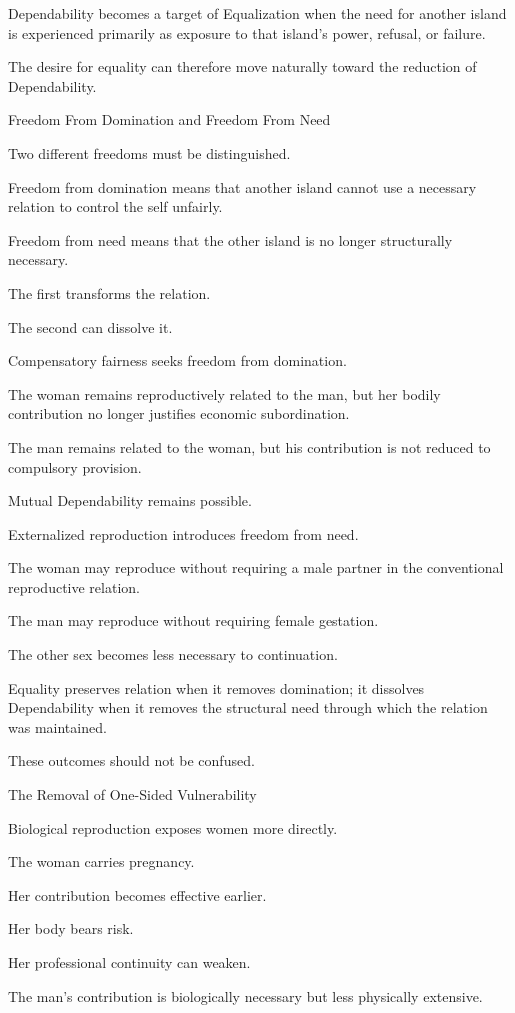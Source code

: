 Dependability becomes a target of Equalization when the need for another island is experienced primarily as exposure to that island’s power, refusal, or failure.

The desire for equality can therefore move naturally toward the reduction of Dependability.

Freedom From Domination and Freedom From Need

Two different freedoms must be distinguished.

Freedom from domination means that another island cannot use a necessary relation to control the self unfairly.

Freedom from need means that the other island is no longer structurally necessary.

The first transforms the relation.

The second can dissolve it.

Compensatory fairness seeks freedom from domination.

The woman remains reproductively related to the man, but her bodily contribution no longer justifies economic subordination.

The man remains related to the woman, but his contribution is not reduced to compulsory provision.

Mutual Dependability remains possible.

Externalized reproduction introduces freedom from need.

The woman may reproduce without requiring a male partner in the conventional reproductive relation.

The man may reproduce without requiring female gestation.

The other sex becomes less necessary to continuation.

Equality preserves relation when it removes domination; it dissolves Dependability when it removes the structural need through which the relation was maintained.

These outcomes should not be confused.

The Removal of One-Sided Vulnerability

Biological reproduction exposes women more directly.

The woman carries pregnancy.

Her contribution becomes effective earlier.

Her body bears risk.

Her professional continuity can weaken.

The man’s contribution is biologically necessary but less physically extensive.

